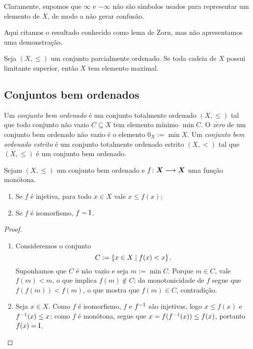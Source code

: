 Claramente, supomos que $\infty$ e $-\infty$ não são símbolos usados para representar um elemento de $X$, de modo a não gerar confusão.



Aqui citamos o resultado conhecido como lema de Zorn, mas não apresentamos uma demonstração.

\begin{lema}
	Seja $(X,\leq)$ um conjunto parcialmente ordenado. Se toda cadeia de $X$ possui limitante superior, então $X$ tem elemento maximal.
\end{lema}



\subsection{Conjuntos bem ordenados}

\begin{definition}
Um \emph{conjunto bem ordenado} é um conjunto totalmente ordenado $(X,\leq)$ tal que todo conjunto não vazio $C \subseteq X$ tem elemento mínimo $\min C$. O \emph{zero} de um conjunto bem ordenado não vazio é o elemento $0_X := \min X$. Um \emph{conjunto bem ordenado estrito} é um conjunto totalmente ordenado estrito $(X,<)$ tal que $(X,\leq)$ é um conjunto bem ordenado.
\end{definition}

\begin{proposition}
	Sejam $(X,\leq)$ um conjunto bem ordenado e ${f}\colon {\bm X} \longrightarrow {\bm X}$ uma função monótona.
		\begin{enumerate}
			\item Se $f$ é injetiva, para todo $x \in X$ vale $x \leq f(x)$;
			\item Se $f$ é isomorfismo, $f=\mathrm{I}$.
		\end{enumerate}
\end{proposition}
\begin{proof}
	\begin{enumerate}
		\item Consideremos o conjunto
			\begin{equation*}
				C := \left\{{x \in X}\;\middle\vert\;{f(x)<x}\right\}.
			\end{equation*}
		Suponhamos que $C$ é não vazio e seja $m := \min C$. Porque $m \in C$, vale $f(m) < m$, o que implica $f(m) \notin C$; da monotonicidade de $f$ segue que $f(f(m)) < f(m)$, o que mostra que $f(m) \in C$, contradição.

		\item Seja $x \in X$. Como $f$ é isomorfismo, $f$ e $f^{-1}$ são injetivas, logo $x \leq f(x)$ e $f^{-1}(x) \leq x$; como $f$ é monótona, segue que $x = f(f^{-1}(x)) \leq f(x)$, portanto $f(x) = \mathrm{I}$.
	\end{enumerate}
\end{proof}

